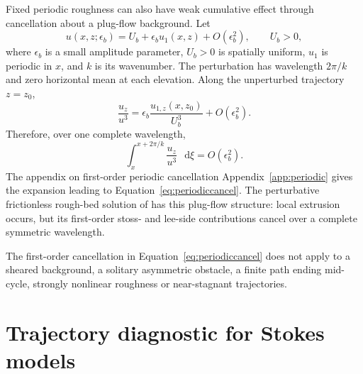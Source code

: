 \documentclass[review]{igs}
\providecommand{\DIFadd}[1]{{\protect\color{blue} \sf #1}} %
\providecommand{\DIFdel}[1]{{\protect\color{red} \scriptsize #1}} %
\providecommand{\DIFaddbegin}{} %
\providecommand{\DIFaddend}{} %
\providecommand{\DIFdelbegin}{} %
\providecommand{\DIFdelend}{} %
\newcommand{\DIFscaledelfig}{0.5}
\newlength{\DIFdelgraphicswidth} %
\newlength{\DIFdelgraphicsheight} %
\newcommand{\DIFaddincludegraphics}[2][]{{\color{blue}\fbox{\DIFOincludegraphics[#1]{#2}}}} %
\newcommand{\DIFdelincludegraphics}[2][]{%
\sbox{\DIFdelgraphicsbox}{\DIFOincludegraphics[#1]{#2}}%
\settoboxwidth{\DIFdelgraphicswidth}{\DIFdelgraphicsbox} %
\settoboxtotalheight{\DIFdelgraphicsheight}{\DIFdelgraphicsbox} %
\scalebox{\DIFscaledelfig}{%
\parbox[b]{\DIFdelgraphicswidth}{\usebox{\DIFdelgraphicsbox}\\[-\baselineskip] \rule{\DIFdelgraphicswidth}{0em}}\llap{\resizebox{\DIFdelgraphicswidth}{\DIFdelgraphicsheight}{%
\setlength{\unitlength}{\DIFdelgraphicswidth}%
\begin{picture}(1,1)%
\thicklines\linethickness{2pt} %
{\color[rgb]{1,0,0}\put(0,0){\framebox(1,1){}}}%
{\color[rgb]{1,0,0}\put(0,0){\line( 1,1){1}}}%
{\color[rgb]{1,0,0}\put(0,1){\line(1,-1){1}}}%
\end{picture}%
}\hspace*{3pt}}} %
} %
\DeclareRobustCommand{\DIFaddbegin}{\DIFOaddbegin \let\includegraphics\DIFaddincludegraphics} %
\DeclareRobustCommand{\DIFaddend}{\DIFOaddend \let\includegraphics\DIFOincludegraphics} %
\DeclareRobustCommand{\DIFdelbegin}{\DIFOdelbegin \let\includegraphics\DIFdelincludegraphics} %
\DeclareRobustCommand{\DIFdelend}{\DIFOaddend \let\includegraphics\DIFOincludegraphics} %
\begin{document}
Fixed periodic roughness can also have weak cumulative effect through cancellation about a plug-flow background. Let
\begin{equation}
 u(x,z;\epsilon_b)=U_b+\epsilon_b u_1(x,z)+O(\epsilon_b^2),
 \qquad U_b>0,
\label{eq:plugperturbation}
\end{equation}
where \(\epsilon_b\) is a small amplitude parameter, \(U_b>0\) is spatially uniform, \(u_1\) is periodic in \(x\), and \(k\) is its wavenumber. The perturbation has wavelength \(2\pi/k\) and zero horizontal mean at each elevation. Along the unperturbed trajectory \(z=z_0\),
\begin{equation}
\frac{u_z}{u^3}
=\epsilon_b\frac{u_{1,z}(x,z_0)}{U_b^3}+O(\epsilon_b^2).
\label{eq:periodicshear}
\end{equation}
Therefore, over one complete wavelength,
\begin{equation}
\int_{x}^{x+2\pi/k}\frac{u_z}{u^3}\,\mathop{}\!\mathrm{d}\xi=O(\epsilon_b^2).
\label{eq:periodiccancel}
\end{equation}
\DIFdelbegin \DIFdel{The appendix on first-order periodic cancellation }\DIFdelend \DIFaddbegin \DIFadd{Appendix~\ref{app:periodic} }\DIFaddend gives the expansion leading to Equation~\ref{eq:periodiccancel}. The perturbative frictionless rough-bed solution of \citet{Gudmundsson1997linear} has this plug-flow structure: local extrusion occurs, but its first-order stoss- and lee-side contributions cancel over a complete symmetric wavelength.

The first-order cancellation in Equation~\ref{eq:periodiccancel} does not apply to a sheared background, a solitary asymmetric obstacle, a finite path ending mid-cycle, strongly nonlinear roughness or near-stagnant trajectories.

\DIFdelbegin %
\DIFdelend \DIFaddbegin \section{Trajectory diagnostic for Stokes models}
\DIFaddend 
\end{document}
